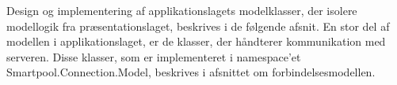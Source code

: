 Design og implementering af applikationslagets modelklasser, der isolere modellogik fra præsentationslaget, beskrives i de følgende afsnit. En stor del af modellen i applikationslaget, er de klasser, der håndterer kommunikation med serveren. Disse klasser, som er implementeret i namespace'et Smartpool.Connection.Model, beskrives i afsnittet om forbindelsesmodellen.